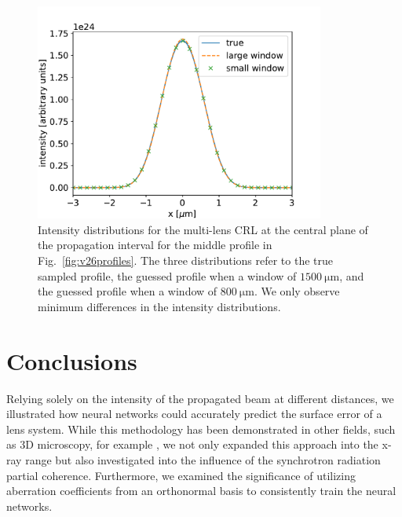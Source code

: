 \documentclass{iucr}
\newcommand{\inred}[1]{{\color{black}#1}}
\begin{document}
\begin{figure}\label{fig:figure8}
\includegraphics[width=0.85\textwidth]{figures/figure8.pdf}

\caption{
Intensity distributions for the multi-lens CRL at the central plane of the propagation interval for the \inred{middle} profile in Fig.~\ref{fig:v26profiles}. The three distributions refer to the true sampled profile, the guessed profile when a window of $\SI{1500}{\micro\meter}$, and the guessed profile when a window of $\SI{800}{\micro\meter}$. We only observe  minimum differences in the intensity distributions.
    }
\end{figure}

\section{Conclusions}\label{sec:conclusions}

\inred{Relying solely on the intensity of the propagated beam at different distances, we illustrated how neural networks could accurately predict the surface error of a lens system. While this methodology has been demonstrated in other fields, such as 3D microscopy, for example \cite{Saha2020}, we not only expanded this approach into the x-ray range but also investigated into the influence of the synchrotron radiation partial coherence. Furthermore, we examined the significance of utilizing aberration coefficients from an orthonormal basis to consistently train the neural networks.}
\end{document}
